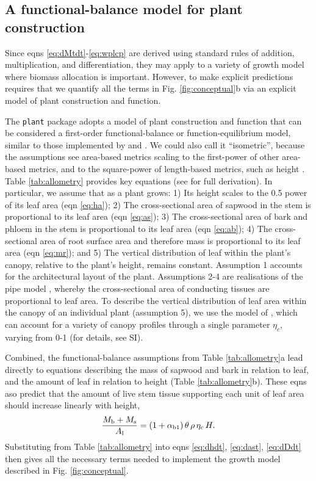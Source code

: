 \documentclass[9pt,twocolumn,twoside,lineno]{pnas-new}
\newcommand{\plant}{\texttt{plant}}
\begin{document}
\subsection*{A functional-balance model for plant construction}

Since eqns \ref{eq:dMtdt}-\ref{eq:wplcp} are derived using standard rules of addition, multiplication, and differentiation, they may apply to a variety of growth model where biomass allocation is important. However, to make explicit predictions requires that we quantify all the terms in Fig. \ref{fig:conceptual}b via an explicit model of plant construction and function.

The {\plant} package adopts a model of plant construction and function that can be considered a first-order functional-balance or function-equilibrium model, similar to those implemented by \citep{Makela-1997} and \citep{Moorcroft-2001}. We could also call it ``isometric'', because the assumptions see area-based metrics scaling to the first-power of other area-based metrics, and to the square-power of length-based metrics, such as height \citep{Huxley-1932}. Table \ref{tab:allometry} provides key equations (see \citep{Falster-2016} for full derivation). In particular, we assume that as a plant grows:
1) Its height scales to the 0.5 power of its leaf area (eqn \ref{eq:ha});
2) The cross-sectional area of sapwood in the stem is proportional to its leaf area (eqn \ref{eq:as});
3) The cross-sectional area of bark and phloem in the stem  is proportional to its leaf area (eqn \ref{eq:ab});
4) The cross-sectional area of root surface area and therefore mass is proportional to its leaf area (eqn \ref{eq:mr}); and
5) The vertical distribution of leaf within the plant's canopy, relative to the plant's height, remains constant.
Assumption 1 accounts for the architectural layout of the plant. Assumptions 2-4 are realisations of the pipe model \citep{Shinozaki-1964}, whereby the cross-sectional area of conducting tissues are proportional to leaf area. To describe the vertical distribution of leaf area within the canopy of an individual plant (assumption 5), we use the model of \citep{Yokozawa-1995}, which can account for a variety of canopy profiles through a single parameter $\eta_c$, varying from 0-1 (for details, see SI).

Combined, the functional-balance assumptions from Table \ref{tab:allometry}a lead directly to equations describing the mass of sapwood and bark in relation to leaf, and the amount of leaf in relation to height (Table \ref{tab:allometry}b). These eqns aso predict that the amount of live stem tissue supporting each unit of leaf area should increase linearly with height,
\begin{equation}\label{eq:msml}
\frac{M_{\rm b} + M_{\rm s}}{A_{\rm l}} = (1+ \alpha_{\rm b1}) \,\theta \, \rho \, \eta_c \, H.
\end{equation}
Substituting from Table \ref{tab:allometry} into eqns \ref{eq:dhdt}, \ref{eq:dast}, \ref{eq:dDdt} then gives all the necessary terms needed to implement the growth model described in Fig. \ref{fig:conceptual}. 
\end{document}
